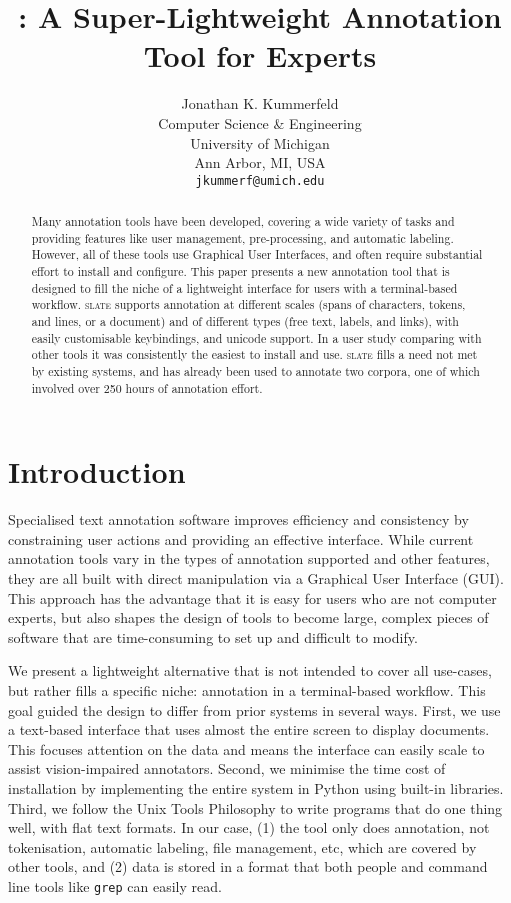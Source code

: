\documentclass[11pt,a4paper]{article}
\title{\slate: A Super-Lightweight Annotation Tool for Experts}
\author{
  Jonathan K. Kummerfeld \\
  Computer Science \& Engineering \\
  University of Michigan \\
  Ann Arbor, MI, USA \\
  {\tt jkummerf@umich.edu}
}
\date{}
\newcommand\Slate{\textsc{slate}\xspace}
\begin{document}
\maketitle

\begin{abstract}

  Many annotation tools have been developed, covering a wide variety of tasks and providing features like user management, pre-processing, and automatic labeling.
  However, all of these tools use Graphical User Interfaces, and often require substantial effort to install and configure.
  This paper presents a new annotation tool that is designed to fill the niche of a lightweight interface for users with a terminal-based workflow.
  \Slate supports annotation at different scales (spans of characters, tokens, and lines, or a document) and of different types (free text, labels, and links), with easily customisable keybindings, and unicode support.
  In a user study comparing with other tools it was consistently the easiest to install and use.
  \Slate fills a need not met by existing systems, and has already been used to annotate two corpora, one of which involved over 250 hours of annotation effort.

\end{abstract}

\section{Introduction}

Specialised text annotation software improves efficiency and consistency by constraining user actions and providing an effective interface.
While current annotation tools vary in the types of annotation supported and other features, they are all built with direct manipulation via a Graphical User Interface (GUI).
This approach has the advantage that it is easy for users who are not computer experts, but also shapes the design of tools to become large, complex pieces of software that are time-consuming to set up and difficult to modify.

We present a lightweight alternative that is not intended to cover all use-cases, but rather fills a specific niche: annotation in a terminal-based workflow.
This goal guided the design to differ from prior systems in several ways.
First, we use a text-based interface that uses almost the entire screen to display documents.
This focuses attention on the data and means the interface can easily scale to assist vision-impaired annotators.
Second, we minimise the time cost of installation by implementing the entire system in Python using built-in libraries.
Third, we follow the Unix Tools Philosophy \citep{unix} to write programs that do one thing well, with flat text formats.
In our case,
(1) the tool only does annotation, not tokenisation, automatic labeling, file management, etc, which are covered by other tools, and
(2) data is stored in a format that both people and command line tools like \texttt{grep} can easily read.
\end{document}
